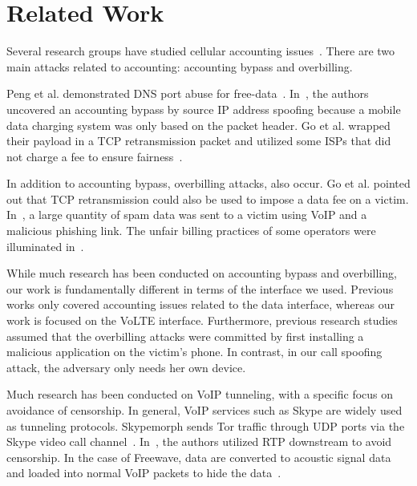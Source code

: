 \chapter{Related Work}
\label{sec:rel}

Several research groups have studied cellular accounting
issues~\cite{peng2014real, go2014gaining, go2013towards,
peng2012mobile,tu2013accounting, peng2012can}. There are two main attacks
related to accounting: accounting bypass and overbilling.

Peng et al. demonstrated DNS port abuse for free-data~\cite{peng2012mobile}.
In~\cite{peng2014real}, the authors uncovered an accounting bypass by source IP
address spoofing because a mobile data charging system was only based on the
packet header. Go et al. wrapped their payload in a TCP retransmission packet
and utilized some ISPs that did not charge a fee to ensure fairness~\cite{go2014gaining, go2013towards}.

In addition to accounting bypass, overbilling attacks, also occur. Go et al. pointed out that
TCP retransmission could also be used to impose a data fee on a
victim. In~\cite{peng2012mobile}, a large quantity of spam data was sent to a victim using
VoIP and a malicious phishing link. The unfair billing practices of some operators were illuminated in~\cite{tu2013accounting, peng2012can}.

While much research has been conducted on accounting bypass and overbilling, our work
is fundamentally different in terms of the interface we used. Previous works
only covered accounting issues related to the data interface, whereas our work is focused
on the VoLTE interface. Furthermore, previous research studies assumed that the overbilling attacks were
committed by first installing  a malicious application on the victim's phone.
In contrast, in our call spoofing attack, the adversary only needs her own device.

Much research has been conducted on VoIP tunneling, with a specific focus on avoidance of censorship.
In general, VoIP services such as Skype are widely used as  tunneling protocols. Skypemorph sends Tor traffic through UDP ports
via the Skype video call channel~\cite{mohajeri2012skypemorph}.
In~\cite{wang2012censorspoofer}, the authors utilized RTP downstream to avoid
censorship.  In the case of Freewave, data are converted to acoustic
signal data and loaded into normal VoIP packets to hide the data~\cite{houmansadr2013want}.

